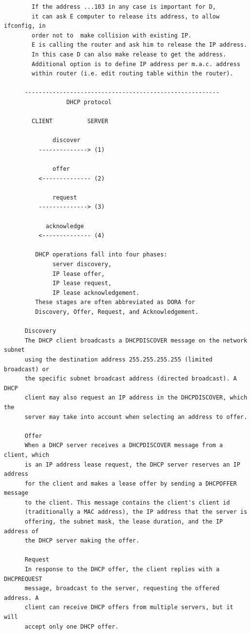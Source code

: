 \documentclass[a4paper,12pt]{article}
\begin{document}
\begin{verbatim}
        If the address ...103 in any case is important for D,
        it can ask E computer to release its address, to allow ifconfig, in 
        order not to  make collision with existing IP.
        E is calling the router and ask him to release the IP address.
        In this case D can also make release to get the address.
        Additional option is to define IP address per m.a.c. address
        within router (i.e. edit routing table within the router).                                            
                     
      --------------------------------------------------------
                  DHCP protocol
         
        CLIENT          SERVER

              discover
          --------------> (1)
            
              offer
          <-------------- (2)  
   
              request
          --------------> (3)
    
            acknowledge
          <-------------- (4)   
   
         DHCP operations fall into four phases: 
              server discovery, 
              IP lease offer, 
              IP lease request, 
              IP lease acknowledgement. 
         These stages are often abbreviated as DORA for 
         Discovery, Offer, Request, and Acknowledgement.
   
      Discovery
      The DHCP client broadcasts a DHCPDISCOVER message on the network subnet             
      using the destination address 255.255.255.255 (limited broadcast) or 
      the specific subnet broadcast address (directed broadcast). A DHCP 
      client may also request an IP address in the DHCPDISCOVER, which the 
      server may take into account when selecting an address to offer.

      Offer 
      When a DHCP server receives a DHCPDISCOVER message from a client, which       
      is an IP address lease request, the DHCP server reserves an IP address 
      for the client and makes a lease offer by sending a DHCPOFFER message 
      to the client. This message contains the client's client id 
      (traditionally a MAC address), the IP address that the server is 
      offering, the subnet mask, the lease duration, and the IP address of 
      the DHCP server making the offer.

      Request
      In response to the DHCP offer, the client replies with a DHCPREQUEST       
      message, broadcast to the server, requesting the offered address. A 
      client can receive DHCP offers from multiple servers, but it will 
      accept only one DHCP offer. 


\end{verbatim}
\end{document}
